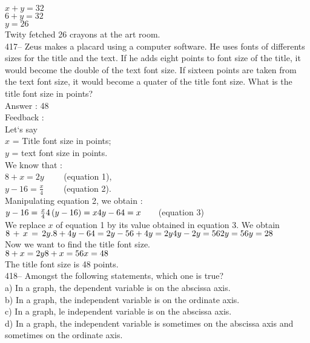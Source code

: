 ﻿\documentclass[letterpaper, 12pt]{article}
\begin{document}
$x+y=32$\\
$6+y=32$\\
$y=26$\\

Twity fetched 26 crayons at the art room.\\

417-- Zeus makes a placard using a computer software. He uses fonts of differents sizes for the title and the text.
  If he adds eight points to font size of the title, it would become the double of the text font size. If sixteen points are taken from the text font size, it would become a quater of the title font size. What is the title font size in points?\\

Answer : 48\\

Feedback : \\
Let`s say\\
$x$ = Title font size in points;\\
$y$ = text font size in points.\\

We know that : \\
$8+x=2y \qquad $ (equation 1),\\
$y-16=\frac{x}{4} \qquad$ (equation 2).\\

Manipulating equation 2, we obtain :\\
$y-16=\frac{x}{4}\\
4\left( y-16\right) =x\\
4y-64=x \qquad $(equation 3)\\

We replace $x$ of equation 1 by its value obtained in equation 3.
We obtain $8\,+\,x\,=\,2y.\\
8+4y-64=2y\\
-56+4y=2y\\
4y-2y=56\\
2y=56\\
y=28$\\

Now we want to find the title font size.\\
$8+x=2y\\
8+x=56\\
x=48$\\

The title font size is 48 points.\\


418-- Amongst the following statements, which one is true?\\
a) In a graph, the dependent variable is on the abscissa axis.\\
b) In a graph, the independent variable is on the ordinate axis.\\
c) In a graph, le independent variable is on the abscissa axis.\\
d) In a graph, the independent variable is sometimes on the abscissa axis and sometimes on the ordinate axis.\\
\end{document}
